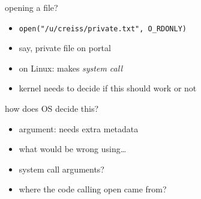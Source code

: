 \begin{frame}{opening a file?}
\begin{itemize}
\item \texttt{open("/u/creiss/private.txt", O\_RDONLY)}
\item say, private file on portal
\vspace{.5cm}
\item on Linux: makes \textit{system call}
\item kernel needs to decide if this should work or not
\end{itemize}
\end{frame}

\begin{frame}{how does OS decide this?}
\begin{itemize}
\item argument: needs extra metadata
\vspace{.5cm}
\item what would be wrong using\ldots
\item system call arguments?
\item where the code calling open came from?
\end{itemize}
\end{frame}


